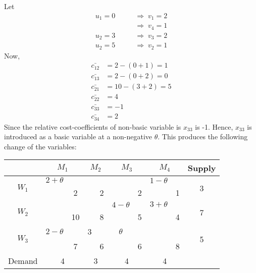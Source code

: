 \documentclass[../main-sheet.tex]{subfiles}
\begin{document}
    Let 
\begin{align*}
    u_1=0\qquad&\Rightarrow\;v_1=2\\
    &\Rightarrow\;v_4=1\\
    u_2=3\qquad&\Rightarrow\;v_3=2\\
    u_2=5\qquad&\Rightarrow\;v_2=1
\end{align*}
Now,
\begin{align*}
    \bar{c_{12}}&=2-(0+1)=1\\
    \bar{c_{13}}&=2-(0+2)=0\\
    \bar{c_{21}}&=10-(3+2)=5\\
    \bar{c_{22}}&=4\\
    \bar{c_{33}}&=-1\\
    \bar{c_{34}}&=2
\end{align*}
Since the relative cost-coefficients of non-basic variable is \(x_{33}\) is -1. Hence, \(x_{33}\) is introduced as a basic variable at a non-negative \(\theta\). This produces the following change of the variables:
    \begin{table}[H]
        \centering
        \begin{tabular}{|c|cc|cc|cc|cc|c|}
        \hline
                               & \multicolumn{2}{c|}{$M_1$} & \multicolumn{2}{c|}{$M_2$} & \multicolumn{2}{c|}{$M_3$} & \multicolumn{2}{c|}{$M_4$} & Supply             \\ \hline
        \multirow{2}{*}{$W_1$} & $2+\theta$            &    &                        &   &                        &   & $1-\theta$             &   & \multirow{2}{*}{3} \\ \cline{3-3} \cline{5-5} \cline{7-7} \cline{9-9}
                               & \multicolumn{1}{c|}{} & 2  & \multicolumn{1}{c|}{}  & 2 & \multicolumn{1}{c|}{}  & 2 & \multicolumn{1}{c|}{}  & 1 &                    \\ \hline
        \multirow{2}{*}{$W_2$} &                       &    &                        &   & $4-\theta$             &   & $3+\theta$             &   & \multirow{2}{*}{7} \\ \cline{3-3} \cline{5-5} \cline{7-7} \cline{9-9}
                               & \multicolumn{1}{c|}{} & 10 & \multicolumn{1}{c|}{}  & 8 & \multicolumn{1}{c|}{}  & 5 & \multicolumn{1}{c|}{}  & 4 &                    \\ \hline
        \multirow{2}{*}{$W_3$} & $2-\theta$            &    & 3                      &   & $\theta$               &   &                        &   & \multirow{2}{*}{5} \\ \cline{3-3} \cline{5-5} \cline{7-7} \cline{9-9}
                               & \multicolumn{1}{c|}{} & 7  & \multicolumn{1}{c|}{}  & 6 & \multicolumn{1}{c|}{}  & 6 & \multicolumn{1}{c|}{}  & 8 &                    \\ \hline
        Demand                 & \multicolumn{2}{c|}{4}     & \multicolumn{2}{c|}{3}     & \multicolumn{2}{c|}{4}     & \multicolumn{2}{c|}{4}     &                    \\ \hline
        \end{tabular}
        \end{table}
\end{document}
